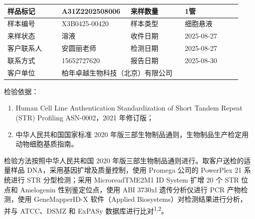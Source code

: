 \documentclass[UTF8,10pt,a4paper,fontset=fandol]{ctexart}
\newcommand{\fieldvalue}[1]{#1}
\begin{document}
\begin{center}
\begin{tabular}{|p{0.22\linewidth}|p{0.28\linewidth}|p{0.22\linewidth}|p{0.23\linewidth}|}
\hline
样品标记 &
\fieldvalue{A31Z2202508006} &
来样数量 &
\fieldvalue{1管} \\
\hline
样本编号 &
\fieldvalue{X3B0425-00420} &
样本类型 &
\fieldvalue{细胞悬液} \\
\hline
来样状态 &
\fieldvalue{溶液} &
收件日期 &
\fieldvalue{2025-08-27} \\
\hline
客户联系人 &
\fieldvalue{安圆丽老师} &
检测日期 &
\fieldvalue{2025-08-27} \\
\hline
联系方式 &
\fieldvalue{15652727620} &
报告日期 &
\fieldvalue{2025-08-30} \\
\hline
\multicolumn{1}{|l|}{客户单位} &
\multicolumn{3}{l|}{%
\fieldvalue{柏年卓越生物科技（北京）有限公司}} \\
\hline
\end{tabular}
\end{center}

\noindent
检验依据：

\begin{enumerate}
\item Human Cell Line Authentication Standardization of Short Tandem Repeat (STR) Profiling ASN-0002，2021 年修订版；
\item 中华人民共和国国家标准 2020 年版三部生物制品通则，生物制品生产检定用动物细胞基质指南。
\end{enumerate}

\noindent
检验方法按照中华人民共和国 2020 年版三部生物制品通则进行。取客户送检的适量样品 DNA，采用基因扩增及质量控制，使用 Promega 公司的 PowerPlex 21 系统进行 STR 分型检测；采用 MicroreadTME2M1 ID System 扩增 20 个 STR 位点和 Amelogenin 性别鉴定位点，使用 ABI 3730xl 遗传分析仪进行 PCR 产物检测，使用 GeneMapperID-X 软件（Applied Biosystems）对检测结果进行分析，并与 ATCC、DSMZ 和 ExPASy 数据库进行比对\textsuperscript{1,2}。
\end{document}
